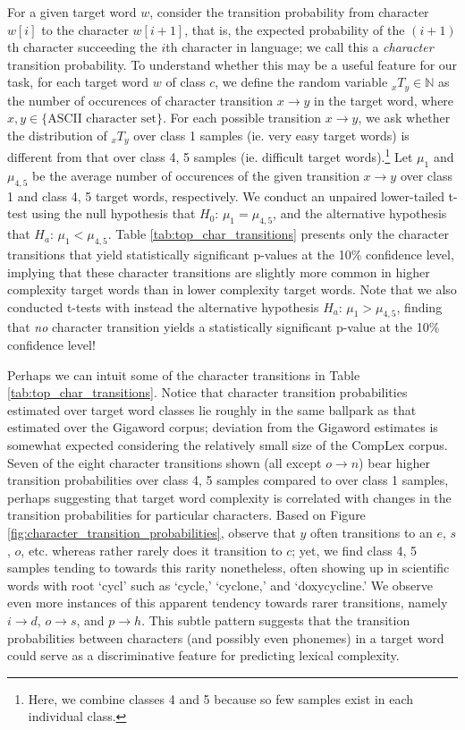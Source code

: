 \documentclass{dcthesis}
\theoremstyle{definition}
\theoremstyle{remark}
\begin{document}
For a given target word $w$, consider the transition probability from character $w[i]$ to the character $w[i+1]$, that is, the expected probability of the $(i+1)$th character succeeding the $i$th character in language; we call this a \textit{character} transition probability. To understand whether this may be a useful feature for our task, for each target word $w$ of class $c$, we define the random variable ${}_xT_y \in \mathbb{N}$ as the number of occurences of character transition $x \rightarrow y$ in the target word, where $x, y \in \{\text{ASCII character set}\}$. For each possible transition $x \rightarrow y$, we ask whether the distribution of ${}_xT_y$ over class 1 samples (ie. very easy target words) is different from that over class 4, 5 samples (ie. difficult target words).\footnote{Here, we combine classes 4 and 5 because so few samples exist in each individual class.} Let $\mu_1$ and $\mu_{4,5}$ be the average number of occurences of the given transition $x \rightarrow y$ over  class 1 and class 4, 5 target words, respectively. We conduct an unpaired lower-tailed t-test using the null hypothesis that $H_0\text{: } \mu_1 = \mu_{4,5}$, and the alternative hypothesis that $H_a\text{: } \mu_1 < \mu_{4,5}$. Table \ref{tab:top_char_transitions} presents only the character transitions that yield statistically significant p-values at the 10\% confidence level, implying that these character transitions are slightly more common in higher complexity target words than in lower complexity target words. Note that we also conducted t-tests with instead the alternative hypothesis $H_a\text{: } \mu_1 > \mu_{4,5}$, finding that \textit{no} character transition yields a statistically significant p-value at the 10\% confidence level! 

Perhaps we can intuit some of the character transitions in Table \ref{tab:top_char_transitions}. Notice that character transition probabilities estimated over target word classes lie roughly in the same ballpark as that estimated over the Gigaword corpus; deviation from the Gigaword estimates is somewhat expected considering the relatively small size of the CompLex corpus. Seven of the eight character transitions shown (all except $o \rightarrow n$) bear higher transition probabilities over class 4, 5 samples compared to over class 1 samples, perhaps suggesting that target word complexity is correlated with changes in the transition probabilities for particular characters. Based on Figure \ref{fig:character_transition_probabilities}, observe that $y$ often transitions to an $e$, $s$, $o$, etc. whereas rather rarely does it transition to $c$; yet, we find class 4, 5 samples tending to towards this rarity nonetheless, often showing up in scientific words with root `cycl' such as `cycle,' `cyclone,' and `doxycycline.' We observe even more instances of this apparent tendency towards rarer transitions, namely $i \rightarrow d$, $o \rightarrow s$, and $p \rightarrow h$. This subtle pattern suggests that the transition probabilities between characters (and possibly even phonemes) in a target word could serve as a discriminative feature for predicting lexical complexity.
\end{document}
